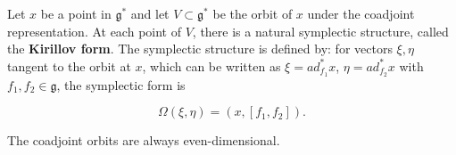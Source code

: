 Let $x$ be a point in $\mathfrak{g}^*$ and let $V \subset \mathfrak{g}^*$ be the orbit of $x$ under the coadjoint representation. At each point of $V$, there is a natural symplectic structure, called the \textbf{Kirillov form}. The symplectic structure is defined by: for vectors $\xi, \eta$ tangent to the orbit at $x$, which can be written as $\xi = ad^*_{f_1} x$, $\eta = ad^*_{f_2} x$ with $f_1, f_2 \in \mathfrak{g}$, the symplectic form is

$$\Omega(\xi, \eta) = (x, [f_1, f_2]).$$

The coadjoint orbits are always even-dimensional.

